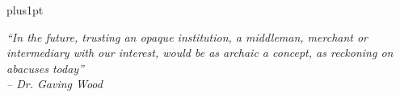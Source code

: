 \documentclass[oneside,11pt]{Latex/Classes/PhDthesisPSnPDF}
\theoremstyle{definition}
\theoremstyle{remark}
\begin{document}
\newpage



\hfuzz=50pt




\renewcommand\baselinestretch{1}
\baselineskip=18pt plus1pt



\begin{center}
\textit{``In the future, trusting an opaque institution, a middleman, merchant or intermediary with our interest, would be as archaic a concept, as reckoning on abacuses today'' \\ {\em } -- Dr. Gaving Wood}
\end{center}














\end{document}
